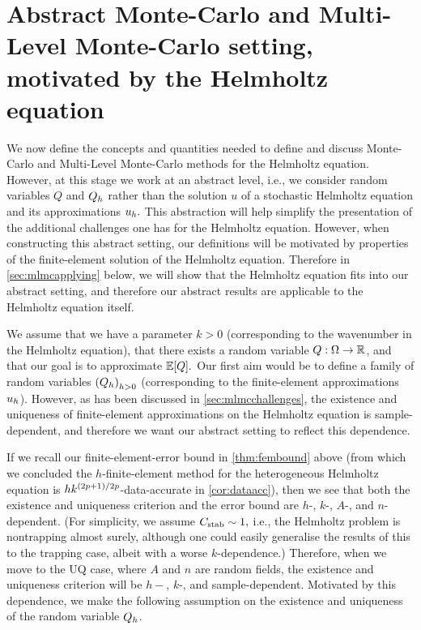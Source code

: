 \section{Abstract Monte-Carlo and Multi-Level Monte-Carlo setting, motivated by the Helmholtz equation}\label{sec:mlmcsetup}
We now define the concepts and quantities needed to define and discuss Monte-Carlo and Multi-Level Monte-Carlo methods for the Helmholtz equation. However, at this stage we work at an abstract level, i.e., we consider random variables $Q$ and $Q_{h}$ rather than the solution $u$ of a stochastic Helmholtz equation and its approximations $u_{h}.$ This abstraction will help simplify the presentation of the additional challenges one has for the Helmholtz equation. However, when constructing this abstract setting, our definitions will be motivated by properties of the finite-element solution of the Helmholtz equation. Therefore in \cref{sec:mlmcapplying} below, we will show that the Helmholtz equation fits into our abstract setting, and therefore our abstract results are applicable to the Helmholtz equation itself.

We assume that we have a parameter $k>0$ (corresponding to the wavenumber in the Helmholtz equation), that there exists a random variable $Q:\Omega\rightarrow\mathbb R$, and that our goal is to approximate $\EXP{Q}.$ Our first aim would be to define a family of random variables $\mleft(\Qh\mright)_{h>0}$ (corresponding to the finite-element approximations $u_{h}$). However, as has been discussed in \cref{sec:mlmcchallenges}, the existence and uniqueness of finite-element approximations on the Helmholtz equation is sample-dependent, and therefore we want our abstract setting to reflect this dependence.

If we recall our finite-element-error bound in \cref{thm:fembound} above (from which we concluded the $h$-finite-element method for the heterogeneous Helmholtz equation is $hk^{(2p+1)/2p}$-data-accurate in \cref{cor:dataacc}), then we see that both the existence and uniqueness criterion and the error bound are $h$-, $k$-, $A$-, and $n$-dependent. (For simplicity, we assume $C_{\mathrm{stab}} \sim 1,$ i.e., the Helmholtz problem is nontrapping almost surely, although one could easily generalise the results of this  to the trapping case, albeit with a worse $k$-dependence.) Therefore, when we move to the UQ case, where $A$ and $n$ are random fields, the existence and uniqueness criterion will be $h-$, $k$-, and sample-dependent. Motivated by this dependence, we make the following assumption on the existence and uniqueness of the random variable $Q_{h}$.

